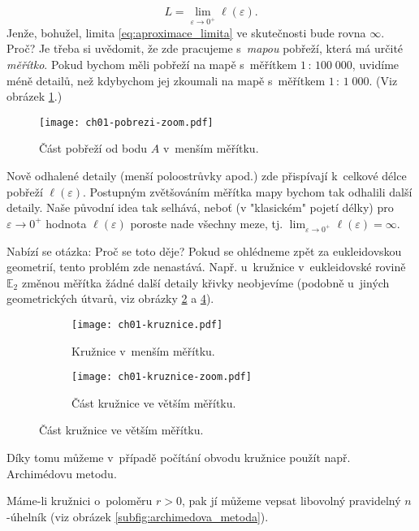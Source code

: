 \begin{equation}\label{eq:aproximace_limita}
    L=\lim_{\varepsilon\to0^+}{\ell(\varepsilon)}.
\end{equation}
Jenže, bohužel, limita \eqref{eq:aproximace_limita} ve skutečnosti bude rovna $\infty$. Proč? Je třeba si uvědomit, že zde pracujeme s~\emph{mapou} pobřeží, která má určité \emph{měřítko}. Pokud bychom měli pobřeží na mapě s~měřítkem $1\,:\,100\;000$, uvidíme méně detailů, než kdybychom jej zkoumali na mapě s~měřítkem $1\,:\,1\;000$. (Viz obrázek \ref{fig:pobrezi_zoom}.)\par
\begin{figure}[h]
    \centering
    \texttt{[image: ch01-pobrezi-zoom.pdf]}
    \caption{Část pobřeží od bodu $A$ v~menším měřítku.}
    \label{fig:pobrezi_zoom}
\end{figure}
Nově odhalené detaily (menší poloostrůvky apod.) zde přispívají k~celkové délce pobřeží $\ell(\varepsilon)$. Postupným zvětšováním měřítka mapy bychom tak odhalili další detaily. Naše původní idea tak selhává, neboť (v "klasickém" pojetí délky) pro $\varepsilon\to0^+$ hodnota $\ell(\varepsilon)$ poroste nade všechny meze, tj. $\lim_{\varepsilon\to0^+}{\ell(\varepsilon)}=\infty$.\par
Nabízí se otázka: Proč se toto děje? Pokud se ohlédneme zpět za eukleidovskou geometrií, tento problém zde nenastává. Např. u~kružnice v~eukleidovské rovině $\mathbb{E}_2$ změnou měřítka žádné další detaily křivky neobjevíme (podobně u~jiných geometrických útvarů, viz obrázky \ref{subfig:kruznice} a \ref{subfig:kruznice_zoom}). 
\begin{figure}[h]
    \centering
    \begin{subfigure}{\subfigwidth}
        \centering
        \texttt{[image: ch01-kruznice.pdf]}
        \caption{Kružnice v~menším měřítku.}
        \label{subfig:kruznice}
    \end{subfigure}
    \quad
    \begin{subfigure}{\subfigwidth}
        \centering
        \texttt{[image: ch01-kruznice-zoom.pdf]}
        \caption{Část kružnice ve větším měřítku.}
        \label{subfig:kruznice_zoom}
    \end{subfigure}
\end{figure}
Díky tomu můžeme v~případě počítání obvodu kružnice použít např. Archimédovu metodu.\par
Máme-li kružnici o~poloměru $r>0$, pak jí můžeme vepsat libovolný pravidelný $n$-úhelník (viz obrázek \ref{subfig:archimedova_metoda}).
